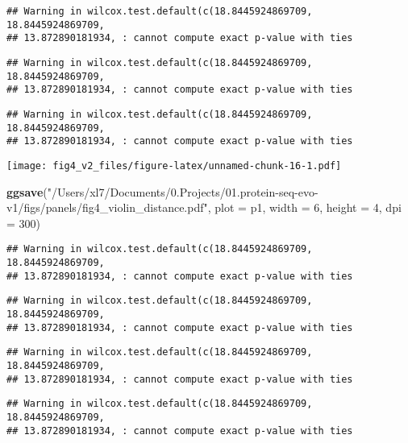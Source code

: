 \documentclass[
]{article}
\newenvironment{Shaded}{\begin{snugshade}}{\end{snugshade}}
\newcommand{\AttributeTok}[1]{\textcolor[rgb]{0.13,0.29,0.53}{#1}}
\newcommand{\DecValTok}[1]{\textcolor[rgb]{0.00,0.00,0.81}{#1}}
\newcommand{\FunctionTok}[1]{\textcolor[rgb]{0.13,0.29,0.53}{\textbf{#1}}}
\newcommand{\NormalTok}[1]{#1}
\newcommand{\StringTok}[1]{\textcolor[rgb]{0.31,0.60,0.02}{#1}}
\begin{document}
\begin{verbatim}
## Warning in wilcox.test.default(c(18.8445924869709, 18.8445924869709,
## 13.872890181934, : cannot compute exact p-value with ties
\end{verbatim}

\begin{verbatim}
## Warning in wilcox.test.default(c(18.8445924869709, 18.8445924869709,
## 13.872890181934, : cannot compute exact p-value with ties
\end{verbatim}

\begin{verbatim}
## Warning in wilcox.test.default(c(18.8445924869709, 18.8445924869709,
## 13.872890181934, : cannot compute exact p-value with ties
\end{verbatim}

\texttt{[image: fig4\_v2\_files/figure-latex/unnamed-chunk-16-1.pdf]}

\begin{Shaded}
\begin{Highlighting}[]
\FunctionTok{ggsave}\NormalTok{(}\StringTok{"/Users/xl7/Documents/0.Projects/01.protein{-}seq{-}evo{-}v1/figs/panels/fig4\_violin\_distance.pdf"}\NormalTok{, }
       \AttributeTok{plot =}\NormalTok{ p1, }\AttributeTok{width =} \DecValTok{6}\NormalTok{, }\AttributeTok{height =} \DecValTok{4}\NormalTok{, }\AttributeTok{dpi =} \DecValTok{300}\NormalTok{)}
\end{Highlighting}
\end{Shaded}

\begin{verbatim}
## Warning in wilcox.test.default(c(18.8445924869709, 18.8445924869709,
## 13.872890181934, : cannot compute exact p-value with ties
\end{verbatim}

\begin{verbatim}
## Warning in wilcox.test.default(c(18.8445924869709, 18.8445924869709,
## 13.872890181934, : cannot compute exact p-value with ties
\end{verbatim}

\begin{verbatim}
## Warning in wilcox.test.default(c(18.8445924869709, 18.8445924869709,
## 13.872890181934, : cannot compute exact p-value with ties
\end{verbatim}

\begin{verbatim}
## Warning in wilcox.test.default(c(18.8445924869709, 18.8445924869709,
## 13.872890181934, : cannot compute exact p-value with ties
\end{verbatim}
\end{document}
